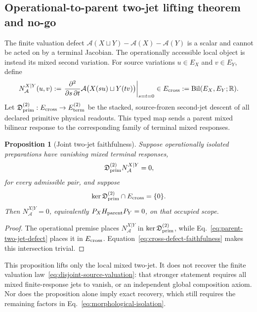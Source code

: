 \documentclass[11pt]{article}
\newtheorem{proposition}{Proposition}
\begin{document}
\subsection{Operational-to-parent two-jet lifting theorem and no-go}

The finite valuation defect
$\mathcal A(X\sqcup Y)-\mathcal A(X)-\mathcal A(Y)$ is a scalar and cannot be
acted on by a terminal Jacobian.  The operationally accessible local object is
instead its mixed second variation.  For source variations
$u\in E_X$ and $v\in E_Y$, define
\begin{equation}
 N_{\mathcal A}^{X|Y}(u,v)
 :=\left.\frac{\partial^2}{\partial s\,\partial t}
 \mathcal A\bigl(X(su)\sqcup Y(tv)\bigr)\right|_{s=t=0}
 \in E_{\rm cross}:=\operatorname{Bil}(E_X,E_Y;\mathbb R).
 \label{eq:parent-two-jet-defect}
\end{equation}
Let
$\mathfrak D_{\rm prim}^{(2)}:E_{\rm cross}\to E_{\rm term}^{(2)}$
be the stacked, source-frozen second-jet descent of all declared primitive
physical readouts.  This typed map sends a parent mixed bilinear response to
the corresponding family of terminal mixed responses.

\begin{proposition}[Joint two-jet faithfulness]
Suppose operationally isolated preparations have vanishing mixed terminal
responses,
\begin{equation}
 \mathfrak D_{\rm prim}^{(2)}N_{\mathcal A}^{X|Y}=0,
\end{equation}
for every admissible pair, and suppose
\begin{equation}
 \ker\mathfrak D_{\rm prim}^{(2)}\cap E_{\rm cross}=\{0\}.
 \label{eq:cross-defect-faithfulness}
\end{equation}
Then $N_{\mathcal A}^{X|Y}=0$, equivalently
$P_XH_{\rm parent}P_Y=0$, on that occupied scope.
\end{proposition}

\begin{proof}
The operational premise places $N_{\mathcal A}^{X|Y}$ in
$\ker\mathfrak D_{\rm prim}^{(2)}$, while
Eq.~\eqref{eq:parent-two-jet-defect} places it in $E_{\rm cross}$.
Equation~\eqref{eq:cross-defect-faithfulness} makes this intersection trivial.
\end{proof}

This proposition lifts only the local mixed two-jet.  It does not recover the
finite valuation law~\eqref{eq:disjoint-source-valuation}: that stronger
statement requires all mixed finite-response jets to vanish, or an independent
global composition axiom.  Nor does the proposition alone imply exact
recovery, which still requires the remaining factors in
Eq.~\eqref{eq:morphological-isolation}.
\end{document}
